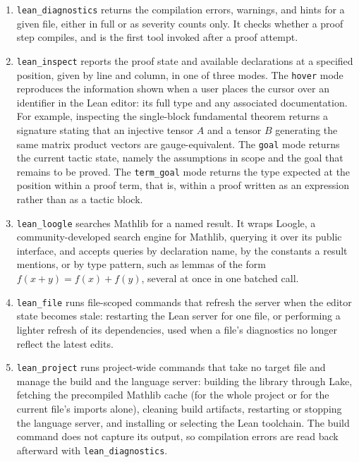 \begin{enumerate}[label={(\roman*)},leftmargin=*]
    \item \texttt{lean\_diagnostics} returns the compilation errors, warnings, and hints for a given file, either in full or as severity counts only. It checks whether a proof step compiles, and is the first tool invoked after a proof attempt.

    \item \texttt{lean\_inspect} reports the proof state and available declarations at a specified position, given by line and column, in one of three modes. The \texttt{hover} mode reproduces the information shown when a user places the cursor over an identifier in the Lean editor: its full type and any associated documentation. For example, inspecting the single-block fundamental theorem returns a signature stating that an injective tensor $A$ and a tensor $B$ generating the same matrix product vectors are gauge-equivalent. The \texttt{goal} mode returns the current tactic state, namely the assumptions in scope and the goal that remains to be proved. The \texttt{term\_goal} mode returns the type expected at the position within a proof term, that is, within a proof written as an expression rather than as a tactic block.

    \item \texttt{lean\_loogle} searches Mathlib for a named result. It wraps Loogle, a community-developed search engine for Mathlib, querying it over its public interface, and accepts queries by declaration name, by the constants a result mentions, or by type pattern, such as lemmas of the form $f(x+y)=f(x)+f(y)$, several at once in one batched call.

    \item \texttt{lean\_file} runs file-scoped commands that refresh the server when the editor state becomes stale: restarting the Lean server for one file, or performing a lighter refresh of its dependencies, used when a file's diagnostics no longer reflect the latest edits.

    \item \texttt{lean\_project} runs project-wide commands that take no target file and manage the build and the language server: building the library through Lake, fetching the precompiled Mathlib cache (for the whole project or for the current file's imports alone), cleaning build artifacts, restarting or stopping the language server, and installing or selecting the Lean toolchain. The build command does not capture its output, so compilation errors are read back afterward with \texttt{lean\_diagnostics}.
\end{enumerate}

